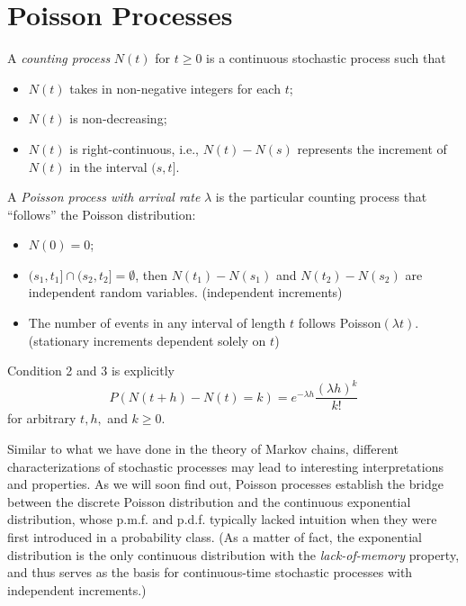 \documentclass[11pt]{article}
\begin{document}
\newpage
\section{Poisson Processes}

A \textit{counting process} $N(t)$ for $t\geq 0$ is a continuous stochastic process such that

\begin{itemize}

\item $N(t)$ takes in non-negative integers for each $t$;

\item $N(t)$ is non-decreasing;

\item $N(t)$ is right-continuous, i.e., $N(t)- N(s)$ represents the increment of $N(t)$ in the interval $(s,t]$.

\end{itemize}

A \textit{Poisson process with arrival rate} $\lambda$ is the particular counting process that “follows” the Poisson distribution:

\begin{itemize}

\item $N(0)=0$;

\item $(s_{1},t_{1}]\cap (s_{2},t_{2}]= \emptyset$, then $N(t_{1})- N(s_{1})$ and $N(t_{2})- N(s_{2})$ are independent random variables. (independent increments)

\item The number of events in any interval of length $t$ follows Poisson$(\lambda t)$. (stationary increments dependent solely on $t$)

\end{itemize}

Condition 2 and 3 is explicitly
\[
P(N(t+h)- N(t)=k)=e^{-\lambda h}\frac{(\lambda h)^{k}}{k!}
\]
for arbitrary $t,h,$ and $k\geq 0$.

Similar to what we have done in the theory of Markov chains, different characterizations of stochastic processes may lead to interesting interpretations and properties. As we will soon find out, Poisson processes establish the bridge between the discrete Poisson distribution and the continuous exponential distribution, whose p.m.f. and p.d.f. typically lacked intuition when they were first introduced in a probability class. (As a matter of fact, the exponential distribution is the only continuous distribution with the \textit{lack-of-memory} property, and thus serves as the basis for continuous-time stochastic processes with independent increments.)
\end{document}
